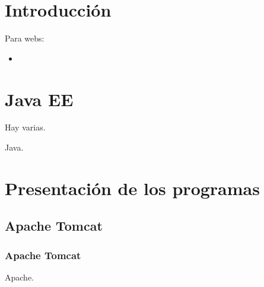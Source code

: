 \documentclass[12pt, aspectratio=169]{beamer} %
\begin{document}
\section{Introducción}
	\begin{frame}
		Para webs:
		
		\begin{itemize}
			\item {}
			
%
%			
%			
%			

		\end{itemize}

	\end{frame}

\section{Java EE}
	\begin{frame}
		Hay varias.
		
		\pause
		
		\alert{Java.}
	\end{frame}

\section{Presentación de los programas}
	\subsection{Apache Tomcat}
		\begin{frame}
			\frametitle{Apache Tomcat}
			
			
			\pause
			
			Apache.
		\end{frame}
\end{document}
